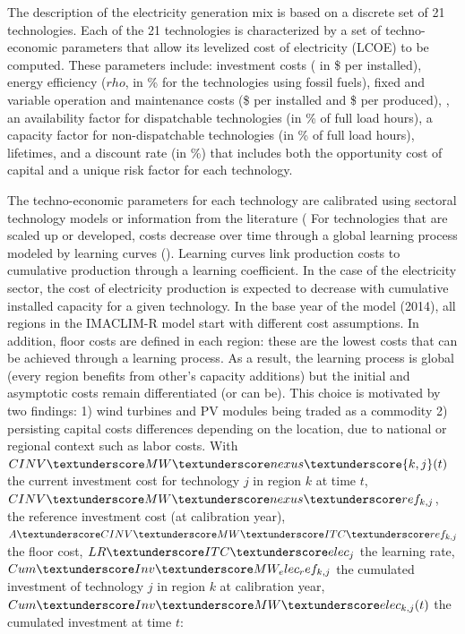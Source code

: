 The description of the electricity generation mix is based on a discrete set of  21  technologies. Each of the  21  technologies is characterized by a set of techno-economic parameters that allow its levelized cost of electricity (LCOE) to be computed. These parameters include: investment costs ( in \$ per \kw  installed), energy efficiency ($rho$, in \% for the technologies using fossil fuels), fixed and variable operation and maintenance costs (\$ per \kw installed and \$ per \kwh produced), , an availability factor for dispatchable technologies (in \% of full load hours), a capacity factor for non-dispatchable technologies (in \% of full load hours), lifetimes, and a discount rate (in \%) that includes both the opportunity cost of capital and a unique risk factor for each technology.

The techno-economic parameters for each technology are calibrated using sectoral technology models or information from the literature (%
For technologies that are scaled up or developed, costs decrease over time through a global learning process modeled by learning curves (\cite{Neij2008}). Learning curves link production costs to cumulative production through a learning coefficient. In the case of the electricity sector, the cost of electricity production is expected to decrease with cumulative installed capacity for a given technology. In the base year of the model (2014), all regions in the IMACLIM-R model start with different cost assumptions. In addition, floor costs are defined in each region: these are the lowest costs that can be achieved through a learning process. As a result, the learning process is global (every region benefits from other's capacity additions) but the initial and asymptotic costs remain differentiated (or can be). This choice is motivated by two findings: 1) wind turbines and PV modules being traded as a commodity 2) persisting capital costs differences depending on the location, due to national or regional context such as labor costs. With $CINV \textunderscore MW\textunderscore nexus\textunderscore {k,j}(t)$ the current investment cost for technology $j$ in region $k$ at time $t$, $CINV\textunderscore MW\textunderscore nexus \textunderscore ref_{k,j}$, the reference investment cost (at calibration year), $A\textunderscore CINV\textunderscore MW\textunderscore ITC\textunderscore ref_{k,j}$ the floor cost,  $LR\textunderscore ITC\textunderscore elec_{j}$ the learning rate, $Cum\textunderscore Inv\textunderscore MW_ elec_ ref_{k,j}$ the cumulated investment of technology $j$ in region $k$ at calibration year, $Cum\textunderscore Inv\textunderscore MW\textunderscore elec_{k,j}(t)$ the cumulated investment at time $t$:

